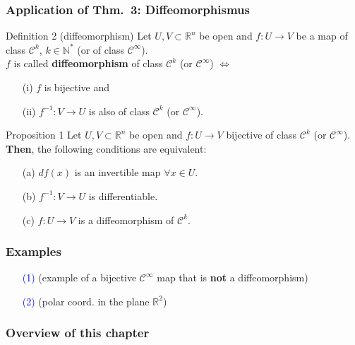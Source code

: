 \documentclass[10pt]{beamer}
\newcommand{\R}{\mathbb{R}}
\newcommand{\N}{\mathbb{N}}
\begin{document}
{\begin{frame}
\frametitle{Application of Thm.~3: Diffeomorphismus}
\begin{alertblock}{Definition 2 (diffeomorphism)}
Let $U,V \subset \R^n$ be open and $f:U \rightarrow V$ be a map of class $\mathcal{C}^k$, $k\in \N^*$ (or of class $\mathcal{C}^\infty$).\\
$f$ is called \textbf{diffeomorphism} of class $\mathcal{C}^k$ (or $\mathcal{C}^\infty$) $\iff$ 
\begin{itemize}
\item[(i)] $f$ is bijective and 
\item[(ii)] $f^{-1}: V \rightarrow U$ is also of class $\mathcal{C}^k$ (or $\mathcal{C}^\infty$).
\end{itemize}
\end{alertblock}
\vspace{0.2cm}
\begin{block}{Proposition 1}
Let $U,V \subset \R^n$ be open and $f:U \rightarrow V$ bijective of class $\mathcal{C}^k$ (or $\mathcal{C}^\infty$).\\
\textbf{Then},  the following conditions are equivalent:
\begin{itemize}
\item[(a)] $df(x)$ is an invertible map $\forall x\in U.$
\item[(b)] $f^{-1}: V \rightarrow U$ is differentiable.
\item[(c)] $f: U \rightarrow V$ is a diffeomorphism of $\mathcal{C}^k$.
\end{itemize}
\end{block}
\end{frame}


\begin{frame}
\frametitle{Examples}
\begin{itemize}
\item[\textcolor{blue}{(1)}] (example of a bijective $\mathcal{C}^\infty$ map that is \textbf{not} a diffeomorphism)\\
\vspace{3cm}
\item[\textcolor{blue}{(2)}] (polar coord. in the plane $\R^2$)\\
\vspace{3cm}
\end{itemize}
\end{frame}


\begin{frame}
\frametitle{Overview of this chapter}
\end{frame}

}
\end{document}
